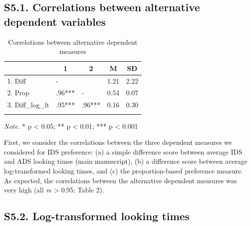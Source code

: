 \documentclass[
  man, donotrepeattitle,floatsintext]{apa6}
\begin{document}
\hypertarget{s5.1.-correlations-between-alternative-dependent-variables}{%
\subsection{S5.1. Correlations between alternative dependent variables}\label{s5.1.-correlations-between-alternative-dependent-variables}}

\begin{table}[tbp]

\begin{center}
\begin{threeparttable}

\caption{\label{tab:unnamed-chunk-27}Correlations between alternative dependent measures}

\begin{tabular}{lllll}
\toprule
 & \multicolumn{1}{c}{1} & \multicolumn{1}{c}{2} & \multicolumn{1}{c}{M} & \multicolumn{1}{c}{SD}\\
\midrule
1. Diff & - &  & 1.21 & 2.22\\
2. Prop & .96*** & - & 0.54 & 0.07\\
3. Diff\_log\_lt & .95*** & .96*** & 0.16 & 0.30\\
\bottomrule
\addlinespace
\end{tabular}

\begin{tablenotes}[para]
\normalsize{\textit{Note.} * p < 0.05; ** p < 0.01; *** p < 0.001}
\end{tablenotes}

\end{threeparttable}
\end{center}

\end{table}

First, we consider the correlations between the three dependent measures we considered for IDS preference: (a) a simple difference score between average IDS and ADS looking times (main manuscript), (b) a difference score between average log-transformed looking times, and (c) the proportion-based preference measure. As expected, the correlations between the alternative dependent measures was very high (all \emph{r}s \textgreater{} 0.95; Table 2).

\hypertarget{s5.2.-log-transformed-looking-times}{%
\subsection{S5.2. Log-transformed looking times}\label{s5.2.-log-transformed-looking-times}}
\end{document}

